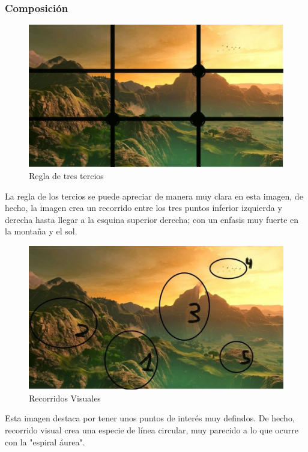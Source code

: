 \documentclass[12pt]{article}
\begin{document}
        \subsubsection{Composición}
          \begin{figure}[H]
            \centering
            \includegraphics[scale = 0.5]{Jesus/Seccion16/Fondo3.JPEG}
            \caption{Regla de tres tercios}
          \end{figure}

          La regla de los tercios se puede apreciar de manera muy clara en esta imagen, de hecho, la imagen crea un recorrido entre los tres puntos inferior izquierda y derecha hasta llegar a la esquina superior derecha; con un enfasis muy fuerte en la montaña y el sol.

          \begin{figure}[H]
            \centering
            \includegraphics[scale = 0.5]{Jesus/Seccion16/Fondo5.JPEG}
            \caption{Recorridos Visuales}
          \end{figure}
          Esta imagen destaca por tener unos puntos de interés muy defindos. 
          De hecho, recorrido visual crea una especie de línea circular, muy parecido a lo que ocurre con la "espiral áurea". 
\end{document}
